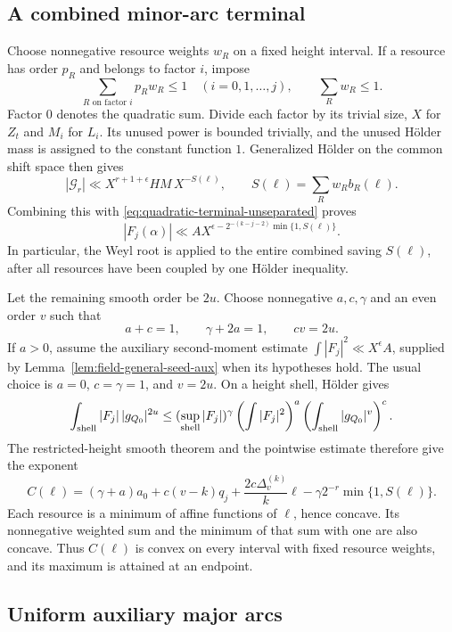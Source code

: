 \documentclass[11pt]{amsart}
\theoremstyle{definition}
\numberwithin{equation}{section}
\begin{document}
\subsection{A combined minor-arc terminal}

Choose nonnegative resource weights $w_R$ on a fixed height interval.
If a resource has order $p_R$ and belongs to factor $i$, impose
\[
 \sum_{R\text{ on factor }i}p_Rw_R\le1
       \quad(i=0,1,\ldots,j),\qquad \sum_R w_R\le1.
\]
Factor $0$ denotes the quadratic sum. Divide each factor by its trivial
size, $X$ for $Z_t$ and $M_i$ for $L_i$. Its unused power is bounded
trivially, and the unused H\"older mass is assigned to the constant
function $1$. Generalized H\"older on the common shift space then gives
\[
 |\mathcal G_r|\ll X^{r+1+\epsilon}HM\,X^{-S(\ell)},\qquad
 S(\ell)=\sum_Rw_Rb_R(\ell).
\]
Combining this with \eqref{eq:quadratic-terminal-unseparated} proves
\begin{equation}\label{eq:quadratic-terminal-pointwise}
 |F_j(\alpha)|\ll A X^{\epsilon-
               2^{-(k-j-2)}\min\{1,S(\ell)\}}.
\end{equation}
In particular, the Weyl root is applied to the entire combined saving
$S(\ell)$, after all resources have been coupled by one H\"older inequality.

Let the remaining smooth order be $2u$. Choose nonnegative
$a,c,\gamma$ and an even order $v$ such that
\[
 a+c=1,\qquad \gamma+2a=1,\qquad cv=2u.
\]
If $a>0$, assume the auxiliary second-moment estimate
$\int|F_j|^2\ll X^\epsilon A$, supplied by
Lemma~\ref{lem:field-general-seed-aux} when its hypotheses hold.
The usual choice is $a=0$, $c=\gamma=1$, and $v=2u$.
On a height shell, H\"older gives
\[
 \int_{\rm shell}|F_j|\,|g_{Q_0}|^{2u}
 \le(\sup_{\rm shell}|F_j|)^\gamma
       \left(\int|F_j|^2\right)^a
       \left(\int_{\rm shell}|g_{Q_0}|^v\right)^c.
\]
The restricted-height smooth theorem and the pointwise estimate
therefore give the exponent
\begin{equation}\label{eq:quadratic-terminal-shell}
 C(\ell)=(\gamma+a)a_0+c(v-k)q_j+
       \frac{2c\Delta_v^{(k)}}k\ell
       -\gamma2^{-r}\min\{1,S(\ell)\}.
\end{equation}
Each resource is a minimum of affine functions of $\ell$,
hence concave. Its nonnegative weighted sum and the minimum
of that sum with one are also concave. Thus $C(\ell)$ is convex
on every interval with fixed resource weights, and its maximum
is attained at an endpoint.

\subsection{Uniform auxiliary major arcs}
\label{sec:aux-major-24}
\end{document}
